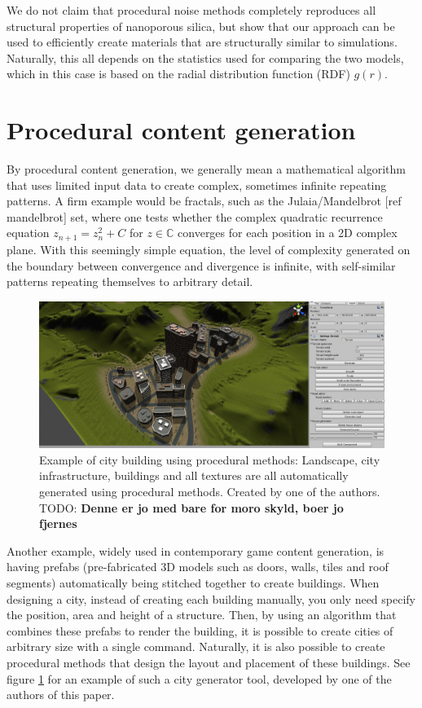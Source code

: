 \documentclass[aps,pre,twocolumn,letterpaper,floatfix,showpacs]{revtex4}
\newcommand{\todo}[1]{ {\color{Magenta} TODO: \color{Blue} \textbf{#1} }}
\begin{document}
We do not claim that procedural noise methods completely reproduces all structural properties of nanoporous silica, but show that our approach can be used to efficiently create materials that are structurally similar to simulations. Naturally, this all depends on the statistics used for comparing the two models, which in this case is based on the radial distribution function (RDF) $g(r)$. 

\section{Procedural content generation}
By procedural content generation, we generally mean a mathematical algorithm that uses limited input data to create complex, sometimes infinite repeating patterns. A firm example would be fractals, such as the Julaia/Mandelbrot [ref mandelbrot] set, where one tests whether the complex quadratic recurrence equation $z_{n+1} = z_n^2 +C$ for $z \in \mathbb C$ converges for each position in a 2D complex plane. With this seemingly simple equation, the level of complexity generated on the boundary between convergence and divergence is infinite, with self-similar patterns repeating themselves to arbitrary detail.
\begin{figure}
\includegraphics[width=.5\textwidth]{orphancity.png}
\caption{Example of city building using procedural methods: Landscape, city infrastructure, buildings and all textures are all automatically generated using procedural methods. Created by one of the authors. \todo{Denne er jo med bare for moro skyld, boer jo fjernes} }
\label{fig:orphancity}
\end{figure}

Another example, widely used in contemporary game content generation, is having prefabs (pre-fabricated 3D models such as doors, walls, tiles and roof segments) automatically being stitched together to create buildings. When designing a city, instead of creating each building manually, you only need specify the position, area and height of a structure. Then, by using an algorithm that combines these prefabs to render the building, it is possible to create cities of arbitrary size with a single command. Naturally, it is also possible to create procedural methods that design the layout and placement of these buildings. See figure \ref{fig:orphancity} for an example of such a city generator tool, developed by one of the authors of this paper. 
\end{document}
